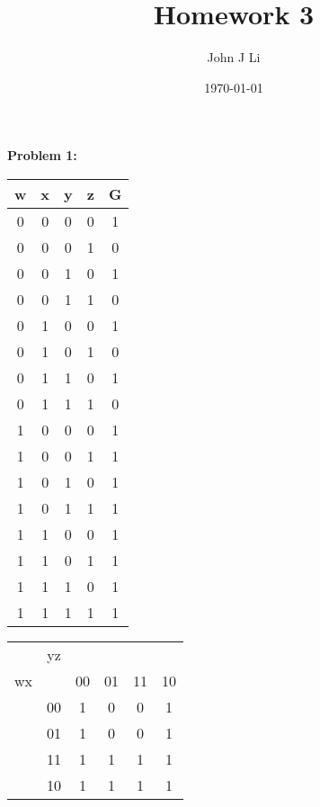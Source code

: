 \documentclass{article}
\title{Homework 3}
\date{\today}
\author{John J Li}
\begin{document}
    \maketitle
    \newpage


    \textbf{Problem 1:}

    \begin{center}
        \begin{tabular} {cccc|c}
            w & x & y & z & G \\
            \hline
            0 & 0 & 0 & 0 & 1 \\
            0 & 0 & 0 & 1 & 0 \\
            0 & 0 & 1 & 0 & 1 \\
            0 & 0 & 1 & 1 & 0 \\
            0 & 1 & 0 & 0 & 1 \\
            0 & 1 & 0 & 1 & 0 \\
            0 & 1 & 1 & 0 & 1 \\
            0 & 1 & 1 & 1 & 0 \\
            1 & 0 & 0 & 0 & 1 \\
            1 & 0 & 0 & 1 & 1 \\
            1 & 0 & 1 & 0 & 1 \\
            1 & 0 & 1 & 1 & 1 \\
            1 & 1 & 0 & 0 & 1 \\
            1 & 1 & 0 & 1 & 1 \\
            1 & 1 & 1 & 0 & 1 \\
            1 & 1 & 1 & 1 & 1 \\
        \end{tabular}
    \end{center}

    \begin{center}
        \begin{tabular} {cc|cccc}
            & yz & &&& \\
            wx && 00 & 01 & 11 & 10 \\
            \hline
            & 00 & 1 & 0 & 0 & 1 \\
            & 01 & 1 & 0 & 0 & 1 \\
            & 11 & 1 & 1 & 1 & 1 \\
            & 10 & 1 & 1 & 1 & 1 \\
        \end{tabular}
    \end{center}
\end{document}
